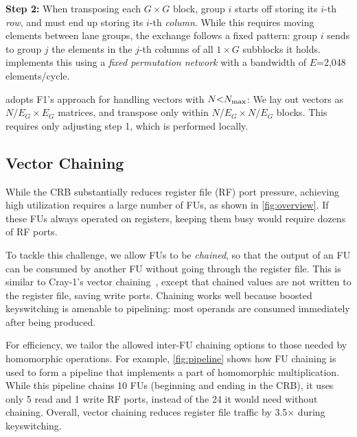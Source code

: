 \textbf{Step 2:} When transposing each $G \times G$ block, group $i$ starts off storing its
$i$-th \emph{row}, and must end up storing its $i$-th \emph{column}.
While this requires moving elements between lane groups, the exchange
follows a fixed pattern:
group $i$ sends to group $j$ the elements in the $j$-th columns of all $1 \times G$
subblocks it holds.
\name implements this using a \emph{fixed permutation network} with a bandwidth
of $E$=2,048 elements/cycle.

\name adopts F1's approach for handling vectors with $N{<}N_{\textrm{max}}$:
We lay out vectors as $N/E_G \times E_G$ matrices, and transpose
only within $N/E_G \times N/E_G$ blocks. This requires only
adjusting step 1, which is performed locally.


\subsection{Vector Chaining}\label{sec:keyswitchingPipeline}

\figPipeline

While the CRB substantially reduces register file (RF) port pressure,
achieving high utilization requires a large number of FUs, as shown in \autoref{fig:overview}.
If these FUs always operated on registers, keeping them busy would require dozens of RF ports.

To tackle this challenge, we allow FUs to be \emph{chained}, so that the output of an FU
can be consumed by another FU without going through the register file.
This is similar to Cray-1's vector chaining~\cite{russell:cacm78:cray}, except that chained values
are not written to the register file, saving write ports.
Chaining works well because boosted keyswitching is amenable to pipelining: 
most operands are consumed immediately after being produced.

For efficiency, we tailor the allowed inter-FU chaining options to those needed by homomorphic operations.
For example, \autoref{fig:pipeline} shows how FU chaining is used to form a pipeline that
implements a part of homomorphic multiplication.
While this pipeline chains 10 FUs (beginning and ending in the CRB), it uses
only 5 read and 1 write RF ports, instead of the 24 it would need without chaining.
Overall, vector chaining reduces register file traffic by 3.5$\times$ during
keyswitching.

